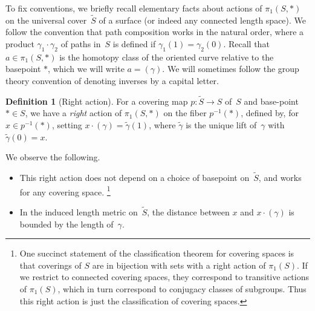 \documentclass[11pt]{amsart}
\numberwithin{equation}{section}
\numberwithin{figure}{section}
\theoremstyle{definition}
\newtheorem{definition}[theorem]{Definition}
\theoremstyle{plain}
\newcommand*{\wt}[1]{\widetilde{#1}}
\begin{document}
To fix conventions, we briefly recall elementary facts about actions of $\pi_1(S,\ast)$ on the universal cover~$\wt S$ of a surface (or indeed any connected length space). We
follow the convention that path composition works in the natural
order, where a product $\gamma_1 \cdot \gamma_2$ of paths in~$S$ is
defined if $\gamma_1(1) = \gamma_2(0)$.
Recall that $a \in \pi_1(S,\ast)$ is the homotopy class of the
oriented curve relative to the basepoint $*$, which we will write $a = (\gamma)$.
 We will sometimes follow the
 group theory convention of denoting inverses by a capital letter.


\begin{definition}[Right action]
For a covering map $p \colon \wt S \to S$ of~$S$ and base-point
$\ast \in S$, we have a \emph{right} action of $\pi_1(S,\ast)$ on
the fiber $p^{-1}(\ast)$, defined by, for $x \in p^{-1}(\ast)$, setting
$x\cdot (\gamma) = \wt \gamma(1)$, where $\wt\gamma$ is the
unique lift of~$\gamma$ with $\wt\gamma(0) = x$.
\end{definition}
We observe
the following.
\begin{itemize}
\item 
  This right action does not depend on a choice of basepoint
  on~$\wt S$, and works for any covering space.%
  \footnote{One succinct statement of the classification theorem for
    covering spaces is that coverings of $S$ are in bijection with
    sets with a right action of $\pi_1(S)$. If we restrict to
    connected covering spaces, they
    correspond to transitive actions of $\pi_1(S)$, which
    in turn correspond to conjugacy classes of subgroups. Thus this
    right action is just the classification of covering spaces.}
\item In the induced length metric on~$\wt S$, the distance between
  $x$ and $x\cdot (\gamma)$ is bounded by the length of~$\gamma$.
\end{itemize}
\end{document}

